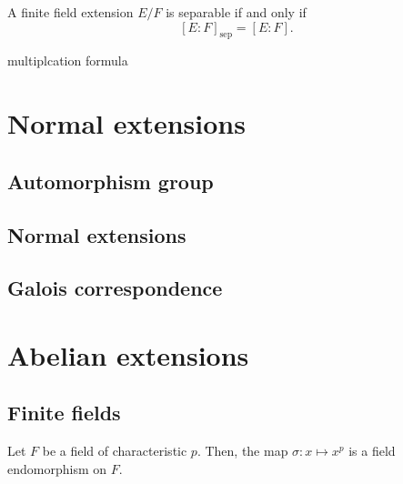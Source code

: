 \documentclass{../note}
\newcommand{\sep}{\mathrm{sep}}
\begin{document}
\begin{thm}
A finite field extension $E/F$ is separable if and only if
\[[E:F]_\sep=[E:F].\]
\end{thm}
\begin{pf}
\end{pf}


multiplcation formula













\chapter{Normal extensions}
\section{Automorphism group}
\section{Normal extensions}
\section{Galois correspondence}







\chapter{Abelian extensions}
\section{Finite fields}
\begin{lem}
Let $F$ be a field of characteristic $p$.
Then, the map $\sigma:x\mapsto x^p$ is a field endomorphism on $F$.
\end{lem}
\end{document}
